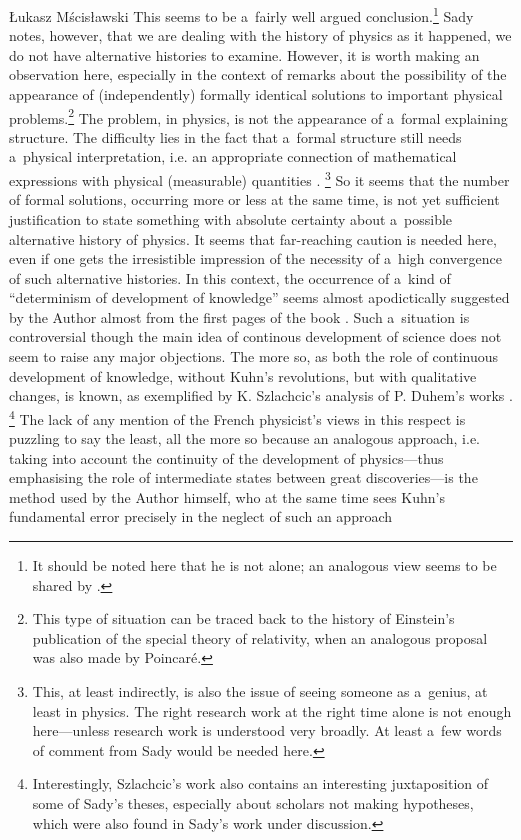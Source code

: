 \begin{newrevengenv}{Łukasz Mścisławski}
This seems to be a~fairly well argued conclusion.\footnote{It should be noted here that he is not alone; an analogous view seems to be shared by
\parencite[][p.238]{szlachic_czy_2010}.%
} Sady notes, however, that we are dealing with the history of physics as it happened, we do not have alternative histories to examine. However, it is worth making an observation here, especially in the context of remarks about the possibility of the appearance of (independently) formally identical solutions to important physical problems.\footnote{This type of situation can be traced back to the history of Einstein's publication of the special theory of relativity, when an analogous proposal was also made by Poincaré. } The problem, in physics, is not the appearance of a~formal explaining structure. The difficulty lies in the fact that a~formal structure still needs a~physical interpretation, i.e. an appropriate connection of mathematical expressions with physical (measurable) quantities 
\parencite[cf.][p.109]{heller_einstein_2006}.%
\footnote{This, at least indirectly, is also the issue of seeing someone as a~genius, at least in physics. The right research work at the right time alone is not enough here---unless research work is understood very broadly. At least a~few words of comment from Sady would be needed here.} So it seems that the number of formal solutions, occurring more or less at the same time, is not yet sufficient justification to state something with absolute certainty about a~possible alternative history of physics. It seems that far-reaching caution is needed here, even if one gets the irresistible impression of the necessity of a~high convergence of such alternative histories. In this context, the occurrence of a~kind of ``determinism of development of knowledge'' seems almost apodictically suggested by the Author almost from the first pages of the book 
\parencite[cf.][p.26]{sady_struktura_2020}. %
 Such a~situation is controversial though the main idea of continous development of science does not seem to raise any major objections. The more so, as both the role of continuous development of knowledge, without Kuhn's revolutions, but with qualitative changes, is known, as exemplified by K. Szlachcic's analysis of P. Duhem's works 
\parencite[][pp.235--240]{szlachic_czy_2010}.%
\footnote{Interestingly, Szlachcic's work also contains an interesting juxtaposition of some of Sady's theses, especially about scholars not making hypotheses, which were also found in Sady's work under discussion.} The lack of any mention of the French physicist's views in this respect is puzzling to say the least, all the more so because an analogous approach, i.e. taking into account the continuity of the development of physics---thus emphasising the role of intermediate states between great discoveries---is the method used by the Author himself, who at the same time sees Kuhn's fundamental error precisely in the neglect of such an approach 

\end{newrevengenv}
